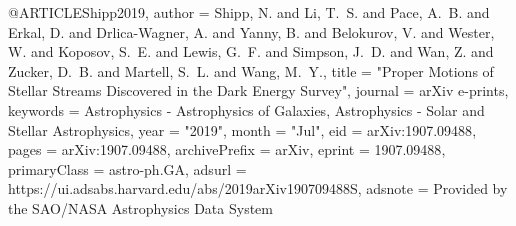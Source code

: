 \documentclass[apj]{emulateapj}
\begin{document}
{{{{{{{{{@ARTICLE{Shipp2019,
       author = {{Shipp}, N. and {Li}, T.~S. and {Pace}, A.~B. and {Erkal}, D. and
         {Drlica-Wagner}, A. and {Yanny}, B. and {Belokurov}, V. and
         {Wester}, W. and {Koposov}, S.~E. and {Lewis}, G.~F. and
         {Simpson}, J.~D. and {Wan}, Z. and {Zucker}, D.~B. and
         {Martell}, S.~L. and {Wang}, M.~Y.},
        title = "{Proper Motions of Stellar Streams Discovered in the Dark Energy Survey}",
      journal = {arXiv e-prints},
     keywords = {Astrophysics - Astrophysics of Galaxies, Astrophysics - Solar and Stellar Astrophysics},
         year = "2019",
        month = "Jul",
          eid = {arXiv:1907.09488},
        pages = {arXiv:1907.09488},
archivePrefix = {arXiv},
       eprint = {1907.09488},
 primaryClass = {astro-ph.GA},
       adsurl = {https://ui.adsabs.harvard.edu/abs/2019arXiv190709488S},
      adsnote = {Provided by the SAO/NASA Astrophysics Data System}
}




}}}}}}}}}
\end{document}
